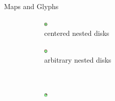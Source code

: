 \documentclass{beamer}
\begin{document}
\begin{frame}{Maps and Glyphs}
  \begin{figure}[!b]
    \centering
    \begin{subfigure}[b]{0.45\linewidth}
      \centering
      \includegraphics[width=0.5\linewidth]{assets/symbol_nested_circles}
      \caption{centered nested disks}
    \end{subfigure}
    \begin{subfigure}[b]{0.45\linewidth}
      \centering
      \includegraphics[width=0.5\linewidth]{assets/symbol_nested_elastic_circles}
      \caption{arbitrary nested disks}
    \end{subfigure}\\
    \begin{subfigure}[b]{0.45\linewidth}
      \centering
      \includegraphics[width=0.5\linewidth]{assets/symbol_pie}

\end{subfigure}
\end{figure}
\end{frame}
\end{document}
